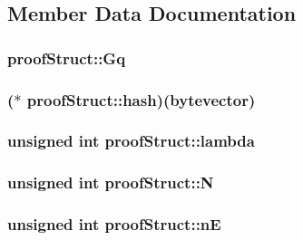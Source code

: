 \subsection{Member Data Documentation}
\hypertarget{structproof_struct_a0f454b14b6f3f83305384a6e989b74e0}{
\subsubsection[{Gq}]{ proof\-Struct\-::\-Gq}}\label{structproof_struct_a0f454b14b6f3f83305384a6e989b74e0}
\hypertarget{structproof_struct_ade50f97f28e5f001864a1c69a39e50f7}{
\subsubsection[{hash}]{($\ast$ proof\-Struct\-::hash)({\bf bytevector})}}\label{structproof_struct_ade50f97f28e5f001864a1c69a39e50f7}
\hypertarget{structproof_struct_a2d90dfe6612e6c274c4a4a10dce67a09}{
\subsubsection[{lambda}]{\setlength{\rightskip}{0pt plus 5cm}unsigned int proof\-Struct\-::lambda}}\label{structproof_struct_a2d90dfe6612e6c274c4a4a10dce67a09}
\hypertarget{structproof_struct_a0cc71ed82e9ffb36d65d14f9175c410e}{
\subsubsection[{N}]{\setlength{\rightskip}{0pt plus 5cm}unsigned int proof\-Struct\-::\-N}}\label{structproof_struct_a0cc71ed82e9ffb36d65d14f9175c410e}
\hypertarget{structproof_struct_aabd2af2f6cf0f54be5760db951f3a659}{
\subsubsection[{n\-E}]{\setlength{\rightskip}{0pt plus 5cm}unsigned int proof\-Struct\-::n\-E}}\label{structproof_struct_aabd2af2f6cf0f54be5760db951f3a659}
